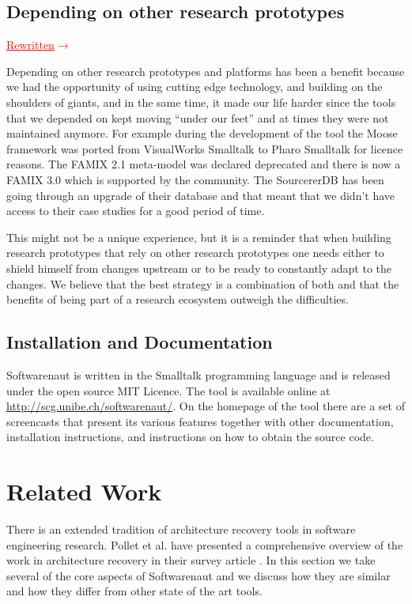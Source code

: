 \documentclass[preprint,12pt]{elsarticle}
\newcommand{\ra}{$\rightarrow$}
\newcommand{\rewritten}{\textcolor{red}{\uline{Rewritten}\ra\space }} %
\begin{document}
\subsection {Depending on other research prototypes }
\rewritten

Depending on other research prototypes and platforms has been a benefit because we had the opportunity of using cutting edge technology, and building on the shoulders of giants, and in the same time, it made our life harder since the tools that we depended on kept moving ``under our feet'' and at times they were not maintained anymore. For example during the development of the tool the Moose framework was ported from VisualWorks Smalltalk to Pharo Smalltalk for licence reasons. The FAMIX 2.1 meta-model was declared deprecated and there is now a FAMIX 3.0 which is supported by the community. The SourcererDB has been going through an upgrade of their database and that meant that we didn't have access to their case studies for a good period of time. 

This might not be a unique experience, but it is a reminder that when building research prototypes that rely on other research prototypes one needs either to shield himself from changes upstream or to be ready to constantly adapt to the changes. We believe that the best strategy is a combination of both and that the benefits of being part of a research ecosystem outweigh the difficulties.


\subsection {Installation and Documentation}
Softwarenaut is written in the Smalltalk programming language and is released under the open source MIT Licence. The tool is available online at {\footnotesize \url{http://scg.unibe.ch/softwarenaut/}}. On the homepage of the tool there are a set of screencasts that present its various features together with other documentation, installation instructions, and instructions on how to obtain the source code. 


\section {Related Work}
\label {sec:rel}

There is an extended tradition of architecture recovery tools in software engineering research. Pollet et al. have presented a comprehensive overview of the work in architecture recovery in their survey article \cite{pollet-sar}. In this section we take several of the core aspects of Softwarenaut and we discuss how they are similar and how they differ from other state of the art tools.
\end{document}
